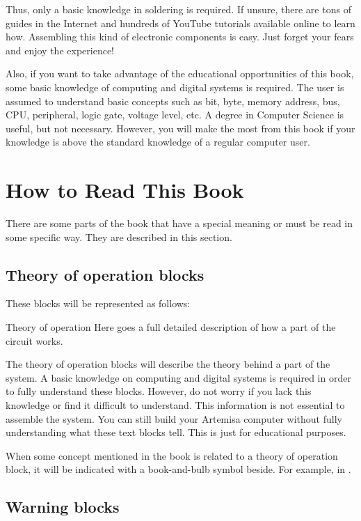 Thus, only a basic knowledge in soldering is required. If unsure, there are tons of guides in the Internet and hundreds of YouTube tutorials available online to learn how. Assembling this kind of electronic components is easy. Just forget your fears and enjoy the experience!

Also, if you want to take advantage of the educational opportunities of this book, some basic knowledge of computing and digital systems is required. The user is assumed to understand basic concepts such as bit, byte, memory address, bus, CPU, peripheral, logic gate, voltage level, etc. A degree in Computer Science is useful, but not necessary. However, you will make the most from this book if your knowledge is above the standard knowledge of a regular computer user.

\section{How to Read This Book}

There are some parts of the book that have a special meaning or must be read in some specific way. They are described in this section. 

\subsection{Theory of operation blocks}

These blocks will be represented as follows:

\begin{theory}[h!]{Theory of operation}
	Here goes a full detailed description of how a part of the circuit works. 	
\end{theory}

The theory of operation blocks will describe the theory behind a part of the system. A basic knowledge on computing and digital systems is required in order to fully understand these blocks. However, do not worry if you lack this knowledge or find it difficult to understand. This information is not essential to assemble the system. You can still build your Artemisa computer without fully understanding what these text blocks tell. This is just for educational purposes.

When some concept mentioned in the book is related to a theory of operation block, it will be indicated with a book-and-bulb symbol beside. For example, in .

\subsection{Warning blocks}

